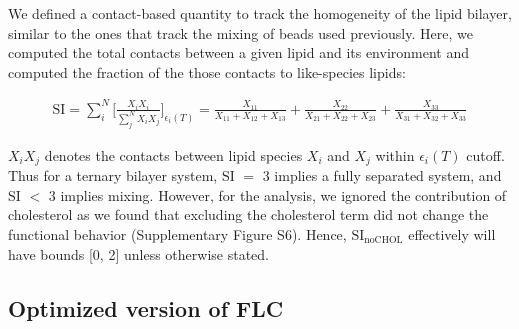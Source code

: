 \documentclass{biophys-new}
\begin{document}
We defined a contact-based quantity to track the homogeneity of the lipid bilayer, similar to the ones that track the mixing of beads used previously\cite{Marigo2012, Kumar2020}.
Here, we computed the total contacts between a given lipid and its environment and computed the fraction of the those contacts to like-species lipids:

\begin{equation}
    \begin{aligned}
    \label{eq:CLT}
    \text{SI} = \sum_{i}^{N}\Bigg[\frac{X_iX_i}{\sum_{j}^{N}X_iX_j}\Bigg]_{\text{$\epsilon_i(T)$}} = \frac{X_{11}}{X_{11} + X_{12} + X_{13}} + \frac{X_{22}}{X_{21} + X_{22} + X_{23}} + \frac{X_{33}}{X_{31} + X_{32} + X_{33}}
    \end{aligned}
\end{equation}

$X_iX_j$ denotes the contacts between lipid species $X_i$ and $X_j$ within $\epsilon_i(T)$ cutoff.
Thus for a ternary bilayer system, SI $=$ 3 implies a fully separated system, and SI $<$ 3 implies mixing.
However, for the analysis, we ignored the contribution of cholesterol as we found that excluding the cholesterol term did not change the functional behavior (Supplementary Figure S6).
Hence, $\text{SI}_{\text{noCHOL}}$ effectively will have bounds [0, 2] unless otherwise stated.    

\subsection*{Optimized version of FLC}
\end{document}
